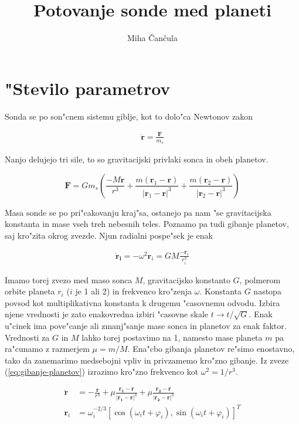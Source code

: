 \documentclass[a4paper,10pt]{article}
\title{Potovanje sonde med planeti}
\author{Miha \v Can\v cula}
\renewcommand{\vec}{\mathbf}
\renewcommand{\phi}{\varphi}
\newcommand{\drug}[1]{
  \vec{\ddot{#1}}
}
\begin{document}
\maketitle

\section{"Stevilo parametrov}

Sonda se po son"cnem sistemu giblje, kot to dolo"ca Newtonov zakon

\begin{align}
  \vec{\ddot r}= \frac{\vec F}{m_s}
\end{align}

Nanjo delujejo tri sile, to so gravitacijski privlaki sonca in obeh planetov. 

$$ \vec F = Gm_s \left( \frac{-M\vec r}{r^3} + \frac{m(\vec r_1 - \vec r)}{|\vec r_1 - \vec r|^3} + \frac{m(\vec r_2 - \vec r)}{|\vec r_2 - \vec r|^3} \right) $$

Masa sonde se po pri"cakovanju kraj"sa, ostanejo pa nam "se gravitacijska konstanta in mase vseh treh nebesnih teles. Poznamo pa tudi gibanje planetov, saj kro"zita okrog zvezde. Njun radialni pospe"sek je enak

\begin{align}
\label{eq:gibanje-planetov}
\vec{\ddot r_i} = -\omega^2\vec r_i = GM \frac{-\vec r_i}{r_i^3}
\end{align}

Imamo torej zvezo med maso sonca $M$, gravitacijsko konstanto $G$, polmerom orbite planeta $r_i$ ($i$ je 1 ali 2) in frekvenco kro"zenja $\omega$. Konstanta $G$ nastopa povsod kot multiplikativna konstanta k drugemu "casovnemu odvodu. Izbira njene vrednosti je zato enakovredna izbiri "casovne skale $t \to t/\sqrt{G}$. Enak u"cinek ima pove"canje ali zmanj"sanje mase sonca in planetov za enak faktor. Vrednosti za $G$ in $M$ lahko torej postavimo na 1, namesto mase planeta $m$ pa ra"cunamo z razmerjem $\mu = m/M$. Ena"cbo gibanja planetov re"simo enostavno, tako da zanemarimo medsebojni vpliv in privzamemo kro"zno gibanje. Iz zveze (\ref{eq:gibanje-planetov}) izrazimo kro"zno frekvenco kot $\omega^2 = 1/r^3$. 

\begin{align}
\drug r &= -\frac{\vec r}{r^3} + \mu\frac{\vec{r_1-r}}{|\vec{r_1-r}|^3} + \mu\frac{\vec{r_2-r}}{|\vec{r_2-r}|^3} \\
\vec r_i &= \omega_i^{-2/3} \left[ \cos(\omega_i t + \phi_i), \sin(\omega_i t + \phi_i) \right]^T
\end{align}
\end{document}
